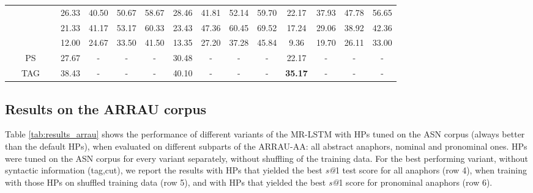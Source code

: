 \documentclass[11pt,letterpaper]{article}
\newcommand{\cmark}{\ding{51}}\newcommand{\xmark}{\ding{55}}
\begin{document}
\begin{table*}[t]
{\begin{tabular}{c|c|c|c|c|c|cccc|cccc|cccc}
{\color{darkred} \xmark} & {\color{darkred} \xmark} & {\color{darkred} \xmark} & {\color{darkred} \xmark} & {\color{darkgreen} \cmark} & {\color{darkgreen} \cmark} & 26.33 & 40.50 & 50.67 & 58.67 & 28.46 & 41.81 & 52.14 & 59.70 & 22.17 & 37.93 & 47.78 & 56.65 \\
{\color{darkgreen} \cmark} & {\color{darkgreen} \cmark} & {\color{darkgreen} \cmark} & {\color{darkgreen} \cmark} & {\color{darkred} \xmark} & {\color{darkgreen} \cmark} &  21.33 & 41.17 & 53.17 & 60.33 & 23.43 & 47.36 & 60.45 & 69.52 & 17.24 & 29.06 & 38.92 & 42.36 \\
{\color{darkgreen} \cmark} & {\color{darkgreen} \cmark} & {\color{darkgreen} \cmark} & {\color{darkgreen} \cmark} & {\color{darkgreen} \cmark} & {\color{darkred} \xmark} &  12.00 & 24.67 & 33.50 & 41.50 & 13.35 & 27.20 & 37.28 & 45.84 & 9.36  & 19.70 & 26.11 & 33.00 \\
\midrule  
\multicolumn{6}{c|}{PS} &  27.67   &  -     &    -   &     -  &30.48   &   -    &    -   &    -   & 22.17   &    -   &   -    &     -  \\
\multicolumn{6}{c|}{TAG} &  38.43& -     & -     & -     & 40.10 & -     & -     & -     & \textbf{35.17} & -     & -     & - \\
\bottomrule
\end{tabular}
}
\caption{Results table for the ARRAU-AA test set. Refer to text for explanation of duplicated rows.}\label{tab:results_arrau}
\end{table*}















 
\subsection{Results on the ARRAU corpus}

Table \ref{tab:results_arrau} shows the performance of different variants of the MR-LSTM with HPs tuned on the ASN corpus (always better than the default HPs), when evaluated on  different subparts of the ARRAU-AA: all  abstract anaphors,  nominal and  pronominal ones. HPs were tuned on the ASN corpus for every variant separately, without shuffling of the training data. For the best performing variant, without syntactic information (tag,cut), we report the results with HPs that yielded the best \textit{s@}1 test score for all anaphors (row 4), when training with those HPs on shuffled training data (row 5), and with HPs that yielded the best \textit{s@}1 score for pronominal anaphors (row 6).
\end{document}
